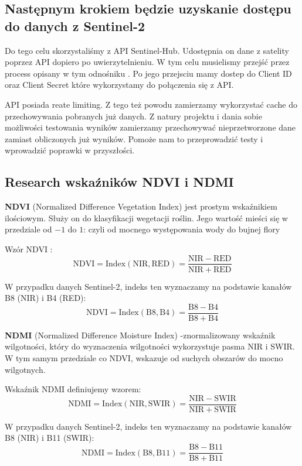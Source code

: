 \documentclass[12pt,a4paper]{article}
\begin{document}
\subsection{Następnym krokiem będzie uzyskanie dostępu do danych z Sentinel-2}

Do tego celu skorzystaliśmy z API Sentinel-Hub. \cite{sentinel2_api_docs} 
Udostępnia on dane z satelity poprzez API dopiero po uwierzytelnieniu. 
W tym celu musielismy przejść przez process opisany w tym odnośniku \cite{sentinel2_api_docs_auth}.
Po jego przejsciu mamy dostep do Client ID oraz Client Secret które wykorzystamy do połączenia się z API.

API posiada reate limiting. 
\cite{sentinel2_api_auth_rate_limiting}
Z tego też powodu zamierzamy wykorzystać cache do przechowywania pobranych już danych.
Z natury projektu i dania sobie możliwości testowania wyników zamierzamy przechowywać nieprzetworzone dane zamiast obliczonych już wyników.
Pomoże nam to przeprowadzić testy i wprowadzić poprawki w przyszłości.

\subsection{Research wskaźników NDVI i NDMI}

\textbf{NDVI} (Normalized Difference Vegetation Index) \cite{ndvi_docs} jest prostym wskaźnikiem ilościowym. Służy on do klasyfikacji wegetacji roślin. Jego wartość mieści się w przedziale od $-1$ do $1$: czyli od mocnego występowania wody do bujnej flory

Wzór NDVI :
\[
\mathrm{NDVI} = \mathrm{Index}(\mathrm{NIR}, \mathrm{RED}) = \frac{\mathrm{NIR} - \mathrm{RED}}{\mathrm{NIR} + \mathrm{RED}}
\]

W przypadku danych Sentinel-2, indeks ten wyznaczamy na podstawie kanałów B8 (NIR) i B4 (RED):
\[
\mathrm{NDVI} = \mathrm{Index}(\mathrm{B8}, \mathrm{B4}) = \frac{\mathrm{B8} - \mathrm{B4}}{\mathrm{B8} + \mathrm{B4}}
\]

\textbf{NDMI} (Normalized Difference Moisture Index) \cite{ndmi_docs} -znormalizowany wskaźnik wilgotności, który do wyznaczenia wilgotności wykorzystuje pasma NIR i SWIR.
W tym samym przedziale co NDVI, wskazuje od suchych obszarów do mocno wilgotnych.

Wskaźnik NDMI definiujemy wzorem:
\[
\mathrm{NDMI} = \mathrm{Index}(\mathrm{NIR}, \mathrm{SWIR}) = \frac{\mathrm{NIR} - \mathrm{SWIR}}{\mathrm{NIR} + \mathrm{SWIR}}
\]

W przypadku danych Sentinel-2, indeks ten wyznaczamy na podstawie kanałów B8 (NIR) i B11 (SWIR):
\[
\mathrm{NDMI} = \mathrm{Index}(\mathrm{B8}, \mathrm{B11}) = \frac{\mathrm{B8} - \mathrm{B11}}{\mathrm{B8} + \mathrm{B11}}
\]
\end{document}
